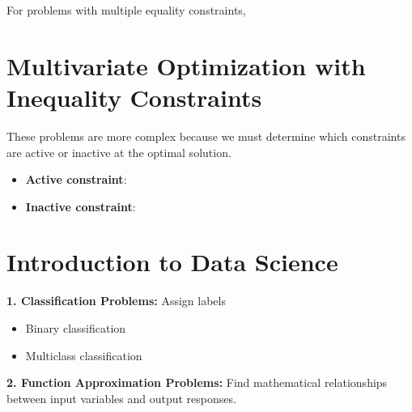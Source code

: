 \documentclass[11pt,a4paper]{article}
\theoremstyle{definition}
\begin{document}
For problems with multiple equality constraints,

\begin{defbox}
\vspace{30mm}
\end{defbox}

\begin{examplebox}
\vspace{70mm}
\end{examplebox}


\section*{Multivariate Optimization with Inequality Constraints}

These problems are more complex because we must determine which constraints are active or inactive at the optimal solution.

\begin{defbox}
\vspace{40mm}
\end{defbox}

\begin{defbox}

\vspace{90mm}
\end{defbox}

\begin{defbox}
\begin{itemize}
    \item \textbf{Active constraint}: 
    \vspace{10mm}
    \item \textbf{Inactive constraint}: 
    \vspace{10mm}
\end{itemize}
\end{defbox}

\begin{examplebox}
\vspace{80mm}
\end{examplebox}


\section*{Introduction to Data Science}

\begin{defbox}
\textbf{1. Classification Problems:} Assign labels 
\begin{itemize}
\item Binary classification
\vspace{10mm}
\item Multiclass classification
\vspace{10mm}
\end{itemize}
\textbf{2. Function Approximation Problems:} Find mathematical relationships between input variables and output responses.
\end{defbox}
\end{document}
